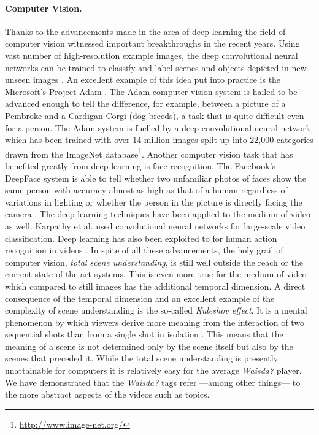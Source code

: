 \paragraph{Computer Vision.} Thanks to the advancements made in the area of deep learning \cite{Bengio:2013:RLR:2498740.2498889,Arel:2010:RFD:1921914.1921920,Schmidhuber:deep-learning} the field of computer vision witnessed important breakthroughs in the recent years. Using vast number of high-resolution example images, the deep convolutional neural networks can be trained to classify and label scenes and objects depicted in new unseen images \cite{NIPS2012_4824,10.1109/TPAMI.2012.231}. An excellent example of this idea put into practice is the Microsoft's Project Adam \cite{project-adam}. The Adam computer vision system is hailed to be advanced enough to tell the difference, for example, between a picture of a Pembroke and a Cardigan Corgi (dog breeds), a task that is quite difficult even for a person. The Adam system is fuelled by a deep convolutional neural network which has been trained with over 14 million images split up into 22,000 categories drawn from the ImageNet database\footnote{\url{http://www.image-net.org/}}. Another computer vision task that has benefited greatly from deep learning is face recognition. The Facebook's DeepFace system is able to tell whether two unfamiliar photos of faces show the same person with accuracy almost as high as that of a human regardless of variations in lighting or whether the person in the picture is directly facing the camera \cite{Taigman_2014_CVPR,DBLP:conf/cvpr/ZhangPTFB15}. The deep learning techniques have been applied to the medium of video as well. Karpathy et al. used convolutional neural networks for large-scale video classification. Deep learning has also been exploited to for human action recognition in videos \cite{DBLP:journals/corr/SimonyanZ14,Ji:2013:CNN:2412386.2412939}. In spite of all these advancements, the holy grail of computer vision, \textit{total scene understanding}, is still well outside the reach or the current state-of-the-art systems. This is even more true for the medium of video which compared to still images has the additional temporal dimension. A direct consequence of the temporal dimension and an excellent example of the complexity of scene understanding is the so-called \textit{Kuleshov effect}. It is a mental phenomenon by which viewers derive more meaning from the interaction of two sequential shots than from a single shot in isolation \cite{mobbs2006kuleshov}. This means that the meaning of a scene is not determined only by the scene itself but also by the scenes that preceded it. While the total scene understanding is presently unattainable for computers it is relatively easy for the average \textit{Waisda?} player. We have demonstrated that the \textit{Waisda?} tags refer ---among other things--- to the more abstract aspects of the videos such as topics.
